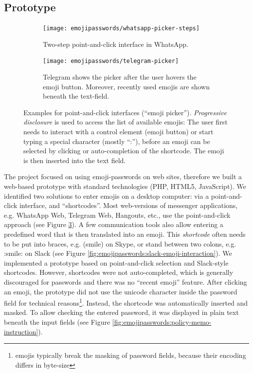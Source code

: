 \subsection{Prototype}
\begin{figure}
	\centering
	\begin{subfigure}[t]{0.49\textwidth}
		\texttt{[image: emojipasswords/whatsapp-picker-steps]}
		\caption{\label{fig:emojipasswords:whatsapp-point-and-click}Two-step point-and-click interface  in WhatsApp.}
	\end{subfigure}
	\begin{subfigure}[t]{0.49\textwidth}
		\texttt{[image: emojipasswords/telegram-picker]}
		\caption{\label{fig:emojipasswords:telegram-point-and-click} Telegram shows the picker after the user hovers  the emoji button. Moreover, recently used emojis are shown beneath the text-field.}
	\end{subfigure}
	
	\caption{\label{fig:emojipasswords:real-world-pickers}
		Examples for point-and-click interfaces (``emoji picker''). \textit{Progressive disclosure} is used to access
		the list of available emojis: The user first needs to interact with a control element (emoji button) or start typing a special character (mostly ``:''), before an emoji can be selected by clicking or auto-completion of the shortcode. The emoji is then inserted into the text field.
	} 
\end{figure}
The project focused on using emoji-passwords on web sites, therefore we built a web-based prototype with standard technologies (PHP, HTML5, JavaScript). We identified two solutions to enter emojis on a desktop computer: via a point-and-click interface, and ``shortcodes''. Most web-versions of messenger applications, e.g. WhatsApp Web, Telegram Web, Hangouts, etc., use the point-and-click approach (see Figure \ref{fig:emojipasswords:real-world-pickers}). A few communication tools also allow entering a predefined word that is then translated into an emoji. This \textit{shortcode} often needs to be put into braces, e.g. (smile) on Skype, or stand between two colons, e.g. :smile: on Slack (see Figure \ref{fig:emojipasswords:slack-emoji-interaction}). We implemented a prototype based on point-and-click selection and Slack-style shortcodes. However, shortcodes were not auto-completed, which is generally discouraged for passwords \cite{Melicher2016UsabilityMobileTextPasswords} and there was no ``recent emoji'' feature. 
After clicking an emoji, the prototype did not use the unicode character inside the password field for technical reasons\footnote{emojis typically break the masking of password fields, because their encoding differs in byte-size}. Instead, the shortcode was automatically inserted and masked. To allow checking the entered password, it was displayed in plain text beneath the input fields (see Figure \ref{fig:emojipasswords:policy-memo-instruction}). 


